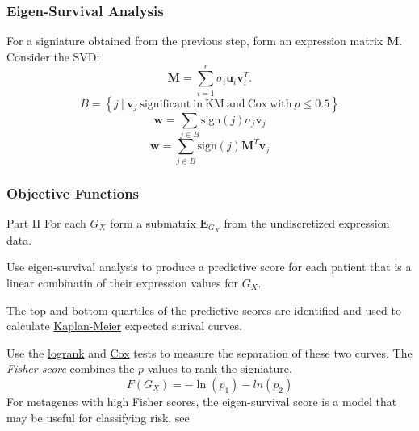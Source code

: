 \documentclass[
	11pt, %
]{beamer}
\begin{document}
\begin{frame}
    \frametitle{Eigen-Survival Analysis}

    For a signiature obtained from the previous step, form an expression matrix $\mathbf{M}$. Consider the SVD:
    \begin{equation*}
        \mathbf{M} = \sum_{i=1}^{r}\sigma_i \mathbf{u}_i \mathbf{v}_i^T.
    \end{equation*}
    \pause
    \begin{equation*}
        B = \left\{ j\ |\ \mathbf{v}_j \mathrm{\ significant\ in\ KM\ and\ Cox\ with\ } p \leq 0.5 \right\}
    \end{equation*}
    \pause
    \begin{equation*}
        \mathbf{w} = \sum_{j \in B}\mathrm{sign}(j)\sigma_j \mathbf{v}_j
    \end{equation*}
    \pause
    \begin{equation*}
        \mathbf{w} = \sum_{j \in B}\mathrm{sign}(j)\mathbf{M}^{T} \mathbf{v}_j
    \end{equation*}
\end{frame}

\begin{frame}
    \frametitle{Objective Functions}
    \begin{block}{Part II}
        For each $G_X$ form a submatrix $\mathbf{E}_{G_X}$ from the undiscretized expression data.
        \smallskip
        \pause

        Use eigen-survival analysis to produce a predictive score for each patient that is a linear combinatin of their expression values for $G_X$.
        \smallskip
        \pause

        The top and bottom quartiles of the predictive scores are identified and used to calculate \href{https://www.mygreatlearning.com/blog/kaplan-meier-curve-explained}{Kaplan-Meier} expected surival curves.
        \smallskip
        \pause

        Use the \href{https://en.wikipedia.org/wiki/Logrank_test}{logrank} and \href{https://encyclopediaofmath.org/wiki/Cox_regression_model}{Cox} tests to measure the separation of these two curves. The \emph{Fisher score} combines the $p$-values to rank the signiature.
        \begin{equation*}
            F(G_X) = -\ln(p_1)-ln(p_2)
        \end{equation*}
        \pause
        For metagenes with high Fisher scores, the eigen-survival score is a model that may be useful for classifying risk, see \cite{p3}
    \end{block}
\end{frame}
\end{document}
